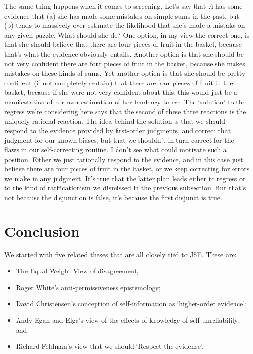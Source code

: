 \documentclass[
  11pt,
  letterpaper,
  DIV=11,
  numbers=noendperiod,
  twoside]{scrartcl}
\providecommand{\tightlist}{%
  \setlength{\itemsep}{0pt}\setlength{\parskip}{0pt}}
\begin{document}
The same thing happens when it comes to screening. Let's say that
\emph{A} has some evidence that (a) she has made some mistakes on simple
sums in the past, but (b) tends to massively over-estimate the
likelihood that she's made a mistake on any given puzzle. What should
she do? One option, in my view the correct one, is that she should
believe that there are four pieces of fruit in the basket, because
that's what the evidence obviously entails. Another option is that she
should be not very confident there are four pieces of fruit in the
basket, because she makes mistakes on these kinds of sums. Yet another
option is that she should be pretty confident (if not completely
certain) that there are four pieces of fruit in the basket, because if
she were not very confident about this, this would just be a
manifestation of her over-estimation of her tendency to err. The
`solution' to the regress we're considering here says that the second of
these three reactions is the uniquely rational reaction. The idea behind
the solution is that we should respond to the evidence provided by
first-order judgments, and correct that judgment for our known biases,
but that we shouldn't in turn correct for the flaws in our
self-correcting routine. I don't see what could motivate such a
position. Either we just rationally respond to the evidence, and in this
case just believe there are four pieces of fruit in the basket, or we
keep correcting for errors we make in any judgment. It's true that the
latter plan leads either to regress or to the kind of ratificationism we
dismissed in the previous subsection. But that's not because the
disjunction is false, it's because the first disjunct is true.

\section{Conclusion}\label{conclusion}

We started with five related theses that are all closely tied to JSE.
These are:

\begin{itemize}
\tightlist
\item
  The Equal Weight View of disagreement;
\item
  Roger White's anti-permissiveness epistemology;
\item
  David Christensen's conception of self-information as `higher-order
  evidence';
\item
  Andy Egan and Elga's view of the effects of knowledge of
  self-unreliability; and
\item
  Richard Feldman's view that we should `Respect the evidence'.
\end{itemize}
\end{document}
